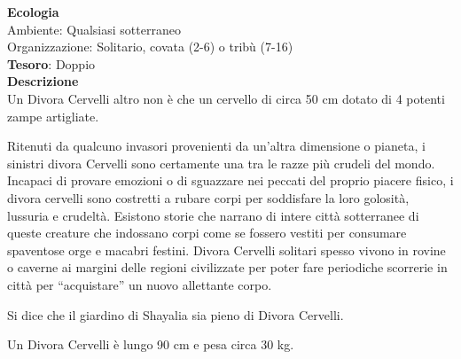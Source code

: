 \begin{multicols}{2}
	\textbf{Ecologia}\\
	Ambiente: Qualsiasi sotterraneo\\
	Organizzazione: Solitario, covata (2-6) o tribù (7-16)\\
	\textbf{Tesoro}: Doppio\\
	\textbf{Descrizione}\\
	Un Divora Cervelli altro non è che un cervello di circa 50 cm dotato di 4 potenti zampe artigliate.

	Ritenuti da qualcuno invasori provenienti da un’altra dimensione o pianeta, i sinistri divora Cervelli sono certamente una tra le razze più crudeli del mondo. Incapaci di provare emozioni o di sguazzare nei peccati del proprio piacere fisico, i divora cervelli sono costretti a rubare corpi per soddisfare la loro golosità, lussuria e crudeltà. Esistono storie che narrano di intere città sotterranee di queste creature che indossano corpi come se fossero vestiti per consumare spaventose orge e macabri festini. Divora Cervelli solitari spesso vivono in rovine o caverne ai margini delle regioni civilizzate per poter fare periodiche scorrerie in città per “acquistare” un nuovo allettante corpo.

	Si dice che il giardino di Shayalia sia pieno di Divora Cervelli.

	Un Divora Cervelli è lungo 90 cm e pesa circa 30 kg.


\end{multicols}
